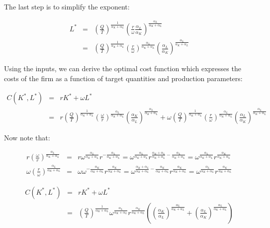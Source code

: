 \documentclass[
]{book}
\begin{document}
The last step is to simplify the exponent:

\begin{eqnarray}
L^* &=& \left(\frac{Q}{T}\right)^{\frac{1}{\alpha_K + \alpha_L}} \left(\frac{r}{\omega}\frac{\alpha_L}{\alpha_K}\right)^{\frac{\alpha_L}{\alpha_K + \alpha_L}} \\
&=& \left(\frac{Q}{T}\right)^{\frac{1}{\alpha_K + \alpha_L}} \left(\frac{r}{\omega}\right)^{\frac{\alpha_L}{\alpha_K + \alpha_L}}\left( \frac{\alpha_L}{\alpha_K}\right)^{\frac{\alpha_L}{\alpha_K + \alpha_L}}
\end{eqnarray}

Using the inputs, we can derive the optimal cost function which expresses the costs of the firm as a function of target quantities and production parameters:

\begin{eqnarray}
C(K^*, L^*) &=& r K^* + \omega L^* \\
&=&r \left(\frac{Q}{T}\right)^{\frac{1}{\alpha_K + \alpha_L}} \left(\frac{\omega}{r}\right)^{\frac{\alpha_L}{\alpha_K + \alpha_L}} \left(\frac{\alpha_K}{\alpha_L}\right)^{\frac{\alpha_L}{\alpha_K + \alpha_L}} + \omega  \left(\frac{Q}{T}\right)^{\frac{1}{\alpha_K + \alpha_L}} \left(\frac{r}{\omega}\right)^{\frac{\alpha_L}{\alpha_K + \alpha_L}}\left( \frac{\alpha_L}{\alpha_K}\right)^{\frac{\alpha_L}{\alpha_K + \alpha_L}}
\end{eqnarray}

Now note that:

\begin{eqnarray}
r\left(\frac{\omega}{r}\right)^{\frac{\alpha_L}{\alpha_K + \alpha_L}} &=& r \omega^{\frac{\alpha_L}{\alpha_K + \alpha_L}} r^{- \frac{\alpha_L}{\alpha_K + \alpha_L}} = \omega^{\frac{\alpha_L}{\alpha_K + \alpha_L}} r^{\frac{\alpha_K + \alpha_L}{\alpha_K + \alpha_L}-\frac{\alpha_L}{\alpha_K + \alpha_L}} = \omega^{\frac{\alpha_L}{\alpha_K + \alpha_L}} r^{ \frac{\alpha_K}{\alpha_K + \alpha_L}} \\
\omega\left(\frac{r}{\omega}\right)^{\frac{\alpha_L}{\alpha_K + \alpha_L}} &=& \omega
\omega^{-\frac{\alpha_K}{\alpha_K + \alpha_L}} r^{\frac{\alpha_K}{\alpha_K + \alpha_L}} = 
\omega^{\frac{\alpha_K + \alpha_L}{\alpha_K + \alpha_L}-\frac{\alpha_K}{\alpha_K + \alpha_L}} r^{\frac{\alpha_K}{\alpha_K + \alpha_L}} = \omega^{\frac{\alpha_L}{\alpha_K + \alpha_L}} r^{\frac{\alpha_K}{\alpha_K + \alpha_L}}
\end{eqnarray}

\begin{eqnarray}
C(K^*, L^*) &=& r K^* + \omega L^* \\
&=& \left(\frac{Q}{T}\right)^{\frac{1}{\alpha_K + \alpha_L}}
\omega^{\frac{\alpha_L}{\alpha_K + \alpha_L}} r^{\frac{\alpha_K}{\alpha_K + \alpha_L}}
\left(\left(\frac{\alpha_K}{\alpha_L}\right)^{\frac{\alpha_L}{\alpha_K + \alpha_L}}  +  \left( \frac{\alpha_L}{\alpha_K}\right)^{\frac{\alpha_L}{\alpha_K + \alpha_L}}\right) 
\end{eqnarray}
\end{document}
